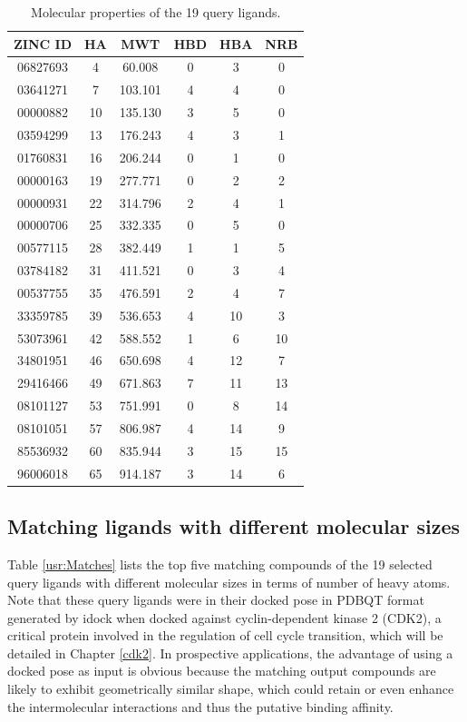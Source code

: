 \begin{table}
\caption{Molecular properties of the 19 query ligands.}
\label{usr:Queries}
\begin{tabular}{cccccc}
\hline
ZINC ID  & HA & MWT & HBD & HBA & NRB\\
\hline
06827693 &  4 &  60.008 & 0 &  3 &  0\\
03641271 &  7 & 103.101 & 4 &  4 &  0\\
00000882 & 10 & 135.130 & 3 &  5 &  0\\
03594299 & 13 & 176.243 & 4 &  3 &  1\\
01760831 & 16 & 206.244 & 0 &  1 &  0\\
00000163 & 19 & 277.771 & 0 &  2 &  2\\
00000931 & 22 & 314.796 & 2 &  4 &  1\\
00000706 & 25 & 332.335 & 0 &  5 &  0\\
00577115 & 28 & 382.449 & 1 &  1 &  5\\
03784182 & 31 & 411.521 & 0 &  3 &  4\\
00537755 & 35 & 476.591 & 2 &  4 &  7\\
33359785 & 39 & 536.653 & 4 & 10 &  3\\
53073961 & 42 & 588.552 & 1 &  6 & 10\\
34801951 & 46 & 650.698 & 4 & 12 &  7\\
29416466 & 49 & 671.863 & 7 & 11 & 13\\
08101127 & 53 & 751.991 & 0 &  8 & 14\\
08101051 & 57 & 806.987 & 4 & 14 &  9\\
85536932 & 60 & 835.944 & 3 & 15 & 15\\
96006018 & 65 & 914.187 & 3 & 14 &  6\\
\hline
\end{tabular}
\end{table}

\subsection{Matching ligands with different molecular sizes}

Table \ref{usr:Matches} lists the top five matching compounds of the 19 selected query ligands with different molecular sizes in terms of number of heavy atoms. Note that these query ligands were in their docked pose in PDBQT format generated by idock \citep{1362} when docked against cyclin-dependent kinase 2 (CDK2), a critical protein involved in the regulation of cell cycle transition, which will be detailed in Chapter \ref{cdk2}. In prospective applications, the advantage of using a docked pose as input is obvious because the matching output compounds are likely to exhibit geometrically similar shape, which could retain or even enhance the intermolecular interactions and thus the putative binding affinity.

